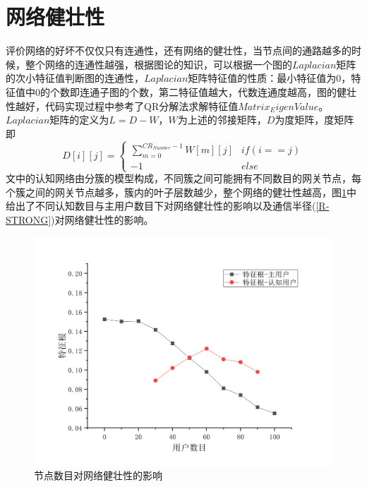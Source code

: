 \documentclass[a4paper,AutoFakeBold,oneside,12pt]{book}
\begin{document}
  \section{网络健壮性}
  评价网络的好坏不仅仅只有连通性，还有网络的健壮性，当节点间的通路越多的时候，整个网络的连通性越强，根据图论的知识，可以根据一个图的$Laplacian$矩阵的次小特征值判断图的连通性，$Laplacian$矩阵特征值的性质：最小特征值为0，特征值中0的个数即连通子图的个数，第二特征值越大，代数连通度越高，图的健壮性越好，代码实现过程中参考了QR分解法求解特征值$Matrix_EigenValue$。$Laplacian$矩阵的定义为$L=D-W$，$W$为上述的邻接矩阵，$D$为度矩阵，度矩阵即
   \begin{equation}
  D[i][j]=
\left\{  
             \begin{array}{lr}  
             
           \displaystyle { \sum_{m=0}^{CR_{Number}-1}} W[m][j] &if(i==j)\\  
             -1 &else
             \end{array}  
\right.  
\end{equation}
  文中的认知网络由分簇的模型构成，不同簇之间可能拥有不同数目的网关节点，每个簇之间的网关节点越多，簇内的叶子层数越少，整个网络的健壮性越高，图\ref{pusu-strong}中给出了不同认知数目与主用户数目下对网络健壮性的影响以及通信半径(\ref{R-STRONG})对网络健壮性的影响。
   \begin{figure}[htbp]
\centering %
\includegraphics[scale=0.3]{pictures/pusu-strong.png} 
\caption{节点数目对网络健壮性的影响} %
\label{pusu-strong}
\end{figure}
\end{document}
